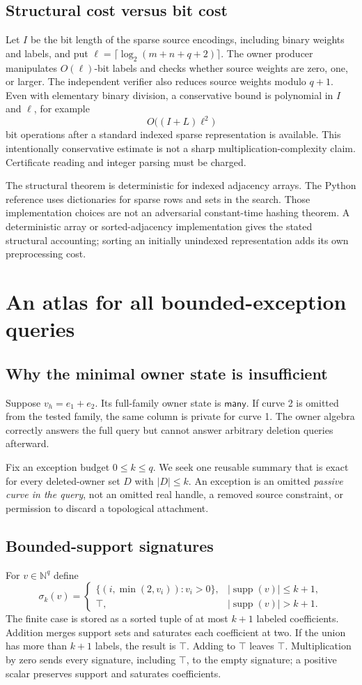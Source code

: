 \documentclass[11pt,letterpaper]{article}
\theoremstyle{definition}
\newcommand{\N}{\mathbb N}
\newcommand{\clash}{\mathsf{many}}
\newcommand{\supp}{\operatorname{supp}}
\begin{document}
\subsection{Structural cost versus bit cost}
Let $I$ be the bit length of the sparse source encodings, including binary weights and labels, and put $\ell=\lceil\log_2(m+n+q+2)\rceil$. The owner producer manipulates $O(\ell)$-bit labels and checks whether source weights are zero, one, or larger. The independent verifier also reduces source weights modulo $q+1$. Even with elementary binary division, a conservative bound is polynomial in $I$ and $\ell$, for example
\[
 O\bigl((I+L)\ell^2\bigr)
\]
bit operations after a standard indexed sparse representation is available. This intentionally conservative estimate is not a sharp multiplication-complexity claim. Certificate reading and integer parsing must be charged.

The structural theorem is deterministic for indexed adjacency arrays. The Python reference uses dictionaries for sparse rows and sets in the search. Those implementation choices are not an adversarial constant-time hashing theorem. A deterministic array or sorted-adjacency implementation gives the stated structural accounting; sorting an initially unindexed representation adds its own preprocessing cost.

\section{An atlas for all bounded-exception queries}
\subsection{Why the minimal owner state is insufficient}
Suppose $v_h=e_1+e_2$. Its full-family owner state is $\clash$. If curve 2 is omitted from the tested family, the same column is private for curve 1. The owner algebra correctly answers the full query but cannot answer arbitrary deletion queries afterward.

Fix an exception budget $0\le k\le q$. We seek one reusable summary that is exact for every deleted-owner set $D$ with $|D|\le k$. An exception is an omitted \emph{passive curve in the query}, not an omitted real handle, a removed source constraint, or permission to discard a topological attachment.

\subsection{Bounded-support signatures}
For $v\in\N^q$ define
\[
 \sigma_k(v)=
 \begin{cases}
 \{(i,\min(2,v_i)):v_i>0\},&|\supp(v)|\le k+1,\\
 \top,&|\supp(v)|>k+1.
 \end{cases}
\]
The finite case is stored as a sorted tuple of at most $k+1$ labeled coefficients. Addition merges support sets and saturates each coefficient at two. If the union has more than $k+1$ labels, the result is $\top$. Adding to $\top$ leaves $\top$. Multiplication by zero sends every signature, including $\top$, to the empty signature; a positive scalar preserves support and saturates coefficients.
\end{document}
